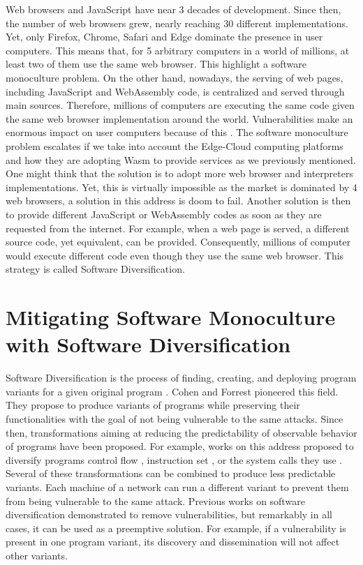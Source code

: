 Web browsers and JavaScript have near 3 decades of development.
Since then, the number of web browsers grew, nearly reaching 30 different implementations. 
Yet, only Firefox, Chrome, Safari and Edge dominate the presence in user computers.
This means that, for 5 arbitrary computers in a world of millions, at least two of them use the same web browser.
This highlight a software monoculture problem.
On the other hand, nowadays, the serving of web pages, including JavaScript and WebAssembly code, is centralized and served through main sources.
Therefore, millions of computers are executing the same code given the same web browser implementation around the world.
Vulnerabilities make an enormous impact on user computers because of this \citationneeded.
The software monoculture problem escalates if we take into account the Edge-Cloud computing platforms and how they are adopting Wasm to provide services as we previously mentioned.
One might think that the solution is to adopt more web browser and interpreters implementations. 
Yet, this is virtually impossible as the market is dominated by 4 web browsers, a solution in this address is doom to fail. 
Another solution is then to provide different JavaScript or WebAssembly codes as soon as they are requested from the internet. 
For example, when a web page is served, a different source code, yet equivalent, can be provided. 
Consequently, millions of computer would execute different code even though they use the same web browser.
This strategy is called Software Diversification.

\section{Mitigating Software Monoculture with Software Diversification}

Software Diversification is the process of finding, creating, and deploying program variants for a given original program \cite{okhravi2013survey}.
Cohen \etal \cite{cohen1993operating} and Forrest \etal \cite{595185} pioneered this field. 
They propose to produce variants of programs while preserving their functionalities with the goal of not being vulnerable to the same attacks.
Since then, transformations aiming at reducing the predictability of observable behavior of programs have been proposed. For example, works on this address proposed to diversify programs control flow \citationneeded, instruction set \citationneeded, or the system calls they use \citationneeded. 
Several of these transformations can be combined to produce less predictable variants.
Each machine of a network can run a different variant to prevent them from being
vulnerable to the same attack.
Previous works on software diversification demonstrated to remove vulnerabilities, but remarkably in all cases, it can be used as a preemptive solution.
For example, if a vulnerability is present in one program variant, its discovery and dissemination will not affect other variants.


